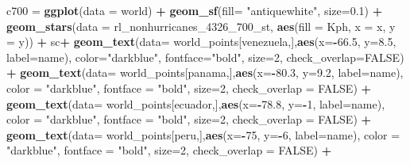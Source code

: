 \documentclass[12pt,twoside]{reedthesis}
\newenvironment{Shaded}{\begin{snugshade}}{\end{snugshade}}
\newcommand{\DataTypeTok}[1]{\textcolor[rgb]{0.13,0.29,0.53}{#1}}
\newcommand{\DecValTok}[1]{\textcolor[rgb]{0.00,0.00,0.81}{#1}}
\newcommand{\FloatTok}[1]{\textcolor[rgb]{0.00,0.00,0.81}{#1}}
\newcommand{\KeywordTok}[1]{\textcolor[rgb]{0.13,0.29,0.53}{\textbf{#1}}}
\newcommand{\NormalTok}[1]{#1}
\newcommand{\OperatorTok}[1]{\textcolor[rgb]{0.81,0.36,0.00}{\textbf{#1}}}
\newcommand{\OtherTok}[1]{\textcolor[rgb]{0.56,0.35,0.01}{#1}}
\newcommand{\StringTok}[1]{\textcolor[rgb]{0.31,0.60,0.02}{#1}}
\begin{document}
\begin{Shaded}
\begin{Highlighting}[]
\NormalTok{c700 =}\StringTok{ }\KeywordTok{ggplot}\NormalTok{(}\DataTypeTok{data =}\NormalTok{ world) }\OperatorTok{+}\StringTok{ }
\StringTok{  }\KeywordTok{geom_sf}\NormalTok{(}\DataTypeTok{fill=} \StringTok{"antiquewhite"}\NormalTok{, }\DataTypeTok{size=}\FloatTok{0.1}\NormalTok{) }\OperatorTok{+}\StringTok{ }
\StringTok{  }\KeywordTok{geom_stars}\NormalTok{(}\DataTypeTok{data =}\NormalTok{ rl_nonhurricanes_}\DecValTok{4326}\NormalTok{_}\DecValTok{700}\NormalTok{_st, }\KeywordTok{aes}\NormalTok{(}\DataTypeTok{fill =}\NormalTok{ Kph, }\DataTypeTok{x =}\NormalTok{ x, }\DataTypeTok{y =}\NormalTok{ y)) }\OperatorTok{+}\StringTok{ }
\StringTok{  }\NormalTok{sc}\OperatorTok{+}
\StringTok{  }\KeywordTok{geom_text}\NormalTok{(}\DataTypeTok{data=}\NormalTok{ world_points[venezuela,],}\KeywordTok{aes}\NormalTok{(}\DataTypeTok{x=}\OperatorTok{-}\FloatTok{66.5}\NormalTok{, }\DataTypeTok{y=}\FloatTok{8.5}\NormalTok{, }\DataTypeTok{label=}\NormalTok{name), }\DataTypeTok{color=}\StringTok{"darkblue"}\NormalTok{, }\DataTypeTok{fontface=}\StringTok{"bold"}\NormalTok{, }\DataTypeTok{size=}\DecValTok{2}\NormalTok{, }\DataTypeTok{check_overlap=}\OtherTok{FALSE}\NormalTok{) }\OperatorTok{+}
\StringTok{  }\KeywordTok{geom_text}\NormalTok{(}\DataTypeTok{data=}\NormalTok{ world_points[panama,],}\KeywordTok{aes}\NormalTok{(}\DataTypeTok{x=}\OperatorTok{-}\FloatTok{80.3}\NormalTok{, }\DataTypeTok{y=}\FloatTok{9.2}\NormalTok{, }\DataTypeTok{label=}\NormalTok{name), }\DataTypeTok{color =} \StringTok{"darkblue"}\NormalTok{, }\DataTypeTok{fontface =} \StringTok{"bold"}\NormalTok{, }\DataTypeTok{size=}\DecValTok{2}\NormalTok{, }\DataTypeTok{check_overlap =} \OtherTok{FALSE}\NormalTok{) }\OperatorTok{+}\StringTok{ }
\StringTok{  }\KeywordTok{geom_text}\NormalTok{(}\DataTypeTok{data=}\NormalTok{ world_points[ecuador,],}\KeywordTok{aes}\NormalTok{(}\DataTypeTok{x=}\OperatorTok{-}\FloatTok{78.8}\NormalTok{, }\DataTypeTok{y=}\OperatorTok{-}\DecValTok{1}\NormalTok{, }\DataTypeTok{label=}\NormalTok{name), }\DataTypeTok{color =} \StringTok{"darkblue"}\NormalTok{, }\DataTypeTok{fontface =} \StringTok{"bold"}\NormalTok{, }\DataTypeTok{size=}\DecValTok{2}\NormalTok{, }\DataTypeTok{check_overlap =} \OtherTok{FALSE}\NormalTok{) }\OperatorTok{+}
\StringTok{  }\KeywordTok{geom_text}\NormalTok{(}\DataTypeTok{data=}\NormalTok{ world_points[peru,],}\KeywordTok{aes}\NormalTok{(}\DataTypeTok{x=}\OperatorTok{-}\DecValTok{75}\NormalTok{, }\DataTypeTok{y=}\OperatorTok{-}\DecValTok{6}\NormalTok{, }\DataTypeTok{label=}\NormalTok{name), }\DataTypeTok{color =} \StringTok{"darkblue"}\NormalTok{, }\DataTypeTok{fontface =} \StringTok{"bold"}\NormalTok{, }\DataTypeTok{size=}\DecValTok{2}\NormalTok{, }\DataTypeTok{check_overlap =} \OtherTok{FALSE}\NormalTok{) }\OperatorTok{+}

\end{Highlighting}
\end{Shaded}
\end{document}
